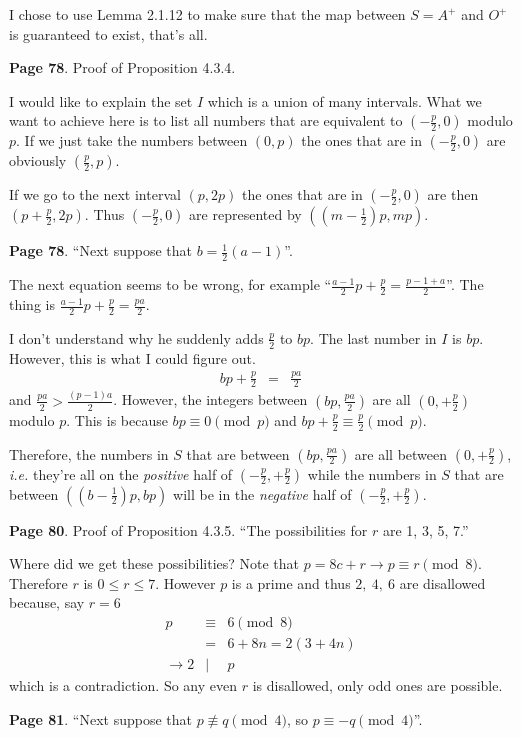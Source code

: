 \documentclass[aps,preprint,preprintnumbers,nofootinbib,showpacs,prd]{revtex4-1}
\newcommand{\ie}{{\it i.e.} }
\newcommand{\nbea}{\begin{eqnarray*}}
\newcommand{\neea}{\end{eqnarray*}}
\begin{document}
I chose to use Lemma 2.1.12 to make sure that the map between $S=A^+$ and $O^+$ is guaranteed to exist, that's all.

{\bf Page 78}. Proof of Proposition 4.3.4.

I would like to explain the set $I$ which is a union of many intervals. What we want to achieve here is to list all numbers that are equivalent to $(-\frac{p}{2}, 0)$ modulo $p$. If we just take the numbers between $(0,p)$ the ones that are in $(-\frac{p}{2}, 0)$ are obviously $(\frac{p}{2}, p)$.

If we go to the next interval $(p, 2p)$ the ones that are in $(-\frac{p}{2}, 0)$ are then $(p + \frac{p}{2}, 2p)$. Thus $(-\frac{p}{2}, 0)$ are represented by $((m - \frac{1}{2})p, mp)$.

{\bf Page 78}. ``Next suppose that $b = \frac{1}{2}(a - 1)$''.

The next equation seems to be wrong, for example ``$\frac{a-1}{2}p + \frac{p}{2} = \frac{p-1+a}{2}$''. The thing is $\frac{a-1}{2}p + \frac{p}{2} = \frac{pa}{2}$.

I don't understand why he suddenly adds $\frac{p}{2}$ to $bp$. The last number in $I$ is $bp$. However, this is what I could figure out.
%
\nbea
bp + \frac{p}{2} & = & \frac{pa}{2}
\neea
%
and $\frac{pa}{2} > \frac{(p-1)a}{2}$. However, the integers between $(bp, \frac{pa}{2})$ are all $(0, +\frac{p}{2})$ modulo $p$. This is because $bp \equiv 0 \pmod{p}$ and $bp + \frac{p}{2} \equiv \frac{p}{2} \pmod{p}$.

Therefore, the numbers in $S$ that are between $(bp, \frac{pa}{2})$ are all between $(0,+\frac{p}{2})$, \ie they're all on the {\it positive} half of $(-\frac{p}{2},+\frac{p}{2})$ while the numbers in $S$ that are between $((b - \frac{1}{2})p, bp)$ will be in the {\it negative} half of $(-\frac{p}{2},+\frac{p}{2})$.

{\bf Page 80}. Proof of Proposition 4.3.5. ``The possibilities for $r$ are 1, 3, 5, 7.''

Where did we get these possibilities? Note that $p = 8c + r \to p \equiv r \pmod{8}$. Therefore $r$ is $0 \le r \le 7$. However $p$ is a prime and thus $2,~ 4,~ 6$ are disallowed because, say $r = 6$
%
\nbea
p & \equiv & 6 \pmod{8} \\
& = & 6 + 8n = 2 (3 + 4n) \\
\to 2 & | & p
\neea
%
which is a contradiction. So any even $r$ is disallowed, only odd ones are possible.

{\bf Page 81}. ``Next suppose that $p \not\equiv q \pmod{4}$, so $p \equiv −q \pmod{4}$''.
\end{document}
